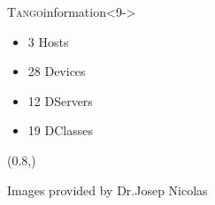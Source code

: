 \documentclass{beamer}
\newcommand{\tango}{\textsc{Tango}}
\begin{document}
\begin{frame}
\begin{textblock*}{35mm}
        \begin{exampleblock}{\tango information}<9->
            \begin{itemize}
                \item 3 Hosts
                \item 28 Devices
                \item 12 DServers
                \item 19 DClasses
            \end{itemize}
        \end{exampleblock}
    \end{textblock*}
    \begin{textblock*}{35mm}(0.8\textwidth,\textheight)
        \begin{block}{}
            \tiny{Images provided by Dr.Josep Nicolas}
        \end{block}
    \end{textblock*}
\end{frame}
\end{document}
